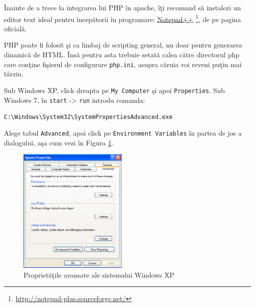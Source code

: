 Înainte de a trece la integrarea lui PHP în apache, îţi recomand să
instalezi un editor text ideal pentru începătorii în programare:
\href{http://notepad-plus.sourceforge.net/}{Notepad++}
\footnote{\url{http://notepad-plus.sourceforge.net/}}, de pe pagina oficială.
%



PHP poate fi folosit şi ca limbaj de scripting general, nu doar pentru
generarea dinamică de HTML. Însă pentru asta trebuie setată calea
către directorul php care conţine fişierul de configurare \texttt{php.ini},
asupra căruia voi reveni puţin mai târziu.

Sub Windows XP, click dreapta pe \texttt{My Computer} şi apoi \texttt{Properties}.
Sub Windows 7, în \texttt{start} -> \texttt{run} introdu comanda:

\texttt{C:{\textbackslash}Windows{\textbackslash}System32{\textbackslash}SystemPropertiesAdvanced.exe}

Alege tabul \texttt{Advanced}, apoi click pe \texttt{Environment Variables} în partea de jos
a dialogului, aşa cum vezi în Figura \ref{fig:win adv props}.
\begin{figure}[ht!]
  \centering
    \includegraphics[width=200px]{cap01/Screenshot-12.png}
  \caption{Proprietăţile avansate ale sistemului Windows XP}
  \label{fig:win adv props}
\end{figure}

